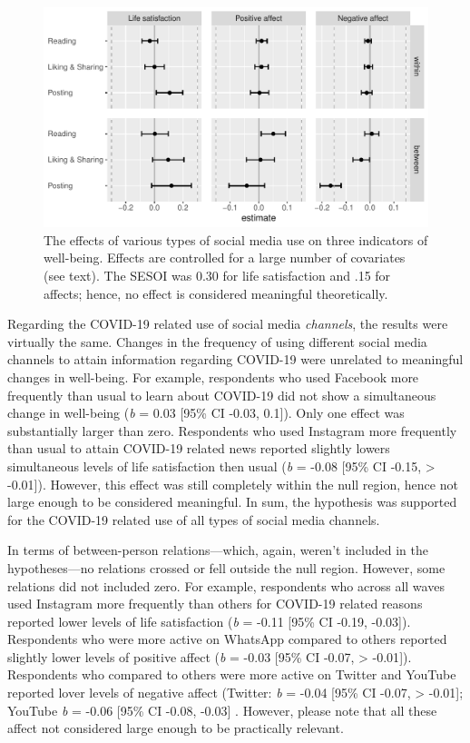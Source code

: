 \documentclass[
  english,
  man,mask,floatsintext]{apa6}
\begin{document}
\begin{figure}[!h]
\includegraphics[width=\textwidth]{figures/fig_results_activity} \caption{The effects of various types of social media use on three indicators of well-being. Effects are controlled for a large number of covariates (see text). The SESOI was 0.30 for life satisfaction and .15 for affects; hence, no effect is considered meaningful theoretically.}\label{fig:fig-res-activity}
\end{figure}

Regarding the COVID-19 related use of social media \emph{channels}, the results were virtually the same.
Changes in the frequency of using different social media channels to attain information regarding COVID-19 were unrelated to meaningful changes in well-being.
For example, respondents who used Facebook more frequently than usual to learn about COVID-19 did not show a simultaneous change in well-being (\emph{b} = 0.03 {[}95\% CI -0.03, 0.1{]}).
Only one effect was substantially larger than zero.
Respondents who used Instagram more frequently than usual to attain COVID-19 related news reported slightly lowers simultaneous levels of life satisfaction then usual (\emph{b} = -0.08 {[}95\% CI -0.15, \textgreater{} -0.01{]}).
However, this effect was still completely within the null region, hence not large enough to be considered meaningful.
In sum, the hypothesis was supported for the COVID-19 related use of all types of social media channels.

In terms of between-person relations---which, again, weren't included in the hypotheses---no relations crossed or fell outside the null region.
However, some relations did not included zero.
For example, respondents who across all waves used Instagram more frequently than others for COVID-19 related reasons reported lower levels of life satisfaction (\emph{b} = -0.11 {[}95\% CI -0.19, -0.03{]}).
Respondents who were more active on WhatsApp compared to others reported slightly lower levels of positive affect (\emph{b} = -0.03 {[}95\% CI -0.07, \textgreater{} -0.01{]}).
Respondents who compared to others were more active on Twitter and YouTube reported lover levels of negative affect (Twitter: \emph{b} = -0.04 {[}95\% CI -0.07, \textgreater{} -0.01{]};
YouTube \emph{b} = -0.06 {[}95\% CI -0.08, -0.03{]} .
However, please note that all these affect not considered large enough to be practically relevant.
\end{document}
